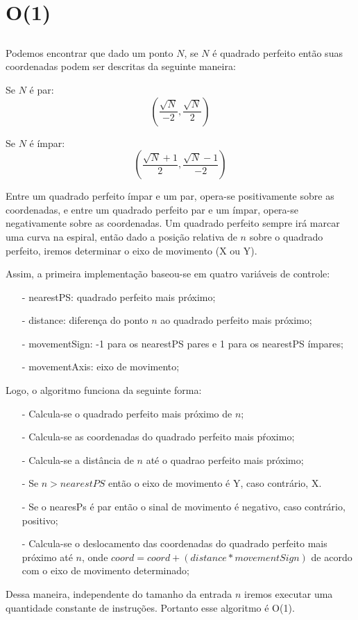 \documentclass[12pt,a4paper]{article}
\begin{document}
\section{O(1)}
    \subsection{}
        Podemos encontrar que dado um ponto $N$, se $N$ é quadrado perfeito então suas coordenadas podem ser descritas da seguinte maneira: 
        
        Se $N$ é par:
        $$(\frac{\sqrt{N}}{-2}, \frac{\sqrt{N}}{2})$$
        
        Se $N$ é ímpar:
        $$(\frac{\sqrt{N} + 1}{2}, \frac{\sqrt{N} - 1}{-2})$$
        
        Entre um quadrado perfeito ímpar e um par, opera-se positivamente sobre as coordenadas, e entre um quadrado perfeito par e um ímpar, opera-se negativamente sobre as coordenadas. Um quadrado perfeito sempre irá marcar uma curva na espiral, então dado a posição relativa de $n$ sobre o quadrado perfeito, iremos determinar o eixo de movimento (X ou Y).

        
        Assim, a primeira implementação baseou-se em quatro variáveis de controle:
        \begin{itemize}
        	\item[-] nearestPS: quadrado perfeito mais próximo;
        	\item[-] distance: diferença do ponto $n$ ao quadrado perfeito mais próximo;
        	\item[-] movementSign: -1 para os nearestPS pares e 1 para os nearestPS ímpares;
        	\item[-] movementAxis: eixo de movimento;
    	\end{itemize}
    	
        Logo, o algoritmo funciona da seguinte forma:
        \begin{itemize}
        	\item[-] Calcula-se o quadrado perfeito mais próximo de $n$;
        	\item[-] Calcula-se as coordenadas do quadrado perfeito mais pŕoximo;
        	\item[-] Calcula-se a distância de $n$ até o quadrao perfeito mais próximo;
        	\item[-] Se  $n > nearestPS$ então o eixo de movimento é Y, caso contrário, X.
        	\item[-] Se o nearesPs é par então o sinal de movimento é negativo, caso contrário, positivo;
        	\item[-] Calcula-se o deslocamento das coordenadas do quadrado perfeito mais próximo até $n$, onde $coord = coord + (distance * movementSign)$ de acordo com o eixo de movimento determinado;
    	\end{itemize}
        Dessa maneira, independente do tamanho da entrada $n$ iremos executar uma quantidade constante de instruções. Portanto esse algoritmo é O(1).
        
\end{document}

